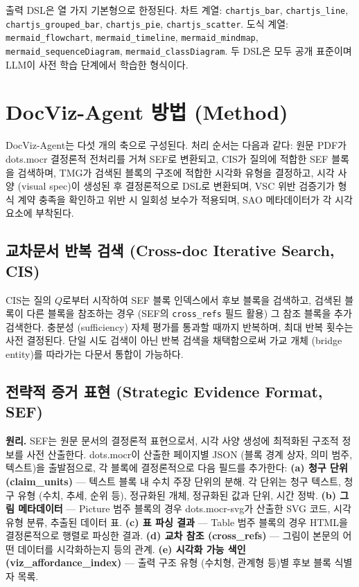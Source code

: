 \documentclass[11pt]{article}
\begin{document}
출력 DSL은 열 가지 기본형으로 한정된다. 차트 계열: \texttt{chartjs\_bar}, \texttt{chartjs\_line}, \texttt{chartjs\_grouped\_bar}, \texttt{chartjs\_pie}, \texttt{chartjs\_scatter}. 도식 계열: \texttt{mermaid\_flowchart}, \texttt{mermaid\_timeline}, \texttt{mermaid\_mindmap}, \texttt{mermaid\_sequenceDiagram}, \texttt{mermaid\_classDiagram}. 두 DSL은 모두 공개 표준이며 LLM이 사전 학습 단계에서 학습한 형식이다.

\section{DocViz-Agent 방법 (Method)}

DocViz-Agent는 다섯 개의 축으로 구성된다. 처리 순서는 다음과 같다: 원문 PDF가 dots.mocr 결정론적 전처리를 거쳐 SEF로 변환되고, CIS가 질의에 적합한 SEF 블록을 검색하며, TMG가 검색된 블록의 구조에 적합한 시각화 유형을 결정하고, 시각 사양 (visual spec)이 생성된 후 결정론적으로 DSL로 변환되며, VSC 위반 검증기가 형식 계약 충족을 확인하고 위반 시 일회성 보수가 적용되며, SAO 메타데이터가 각 시각 요소에 부착된다.

\subsection{교차문서 반복 검색 (Cross-doc Iterative Search, CIS)}

CIS는 질의 $Q$로부터 시작하여 SEF 블록 인덱스에서 후보 블록을 검색하고, 검색된 블록이 다른 블록을 참조하는 경우 (SEF의 \texttt{cross\_refs} 필드 활용) 그 참조 블록을 추가 검색한다. 충분성 (sufficiency) 자체 평가를 통과할 때까지 반복하며, 최대 반복 횟수는 사전 결정된다. 단일 시도 검색이 아닌 반복 검색을 채택함으로써 가교 개체 (bridge entity)를 따라가는 다문서 통합이 가능하다.

\subsection{전략적 증거 표현 (Strategic Evidence Format, SEF)}
\label{sec:sef}

\textbf{원리.} SEF는 원문 문서의 결정론적 표현으로서, 시각 사양 생성에 최적화된 구조적 정보를 사전 산출한다. dots.mocr이 산출한 페이지별 JSON (블록 경계 상자, 의미 범주, 텍스트)을 출발점으로, 각 블록에 결정론적으로 다음 필드를 추가한다: \textbf{(a) 청구 단위 (claim\_units)} — 텍스트 블록 내 수치 주장 단위의 분해. 각 단위는 청구 텍스트, 청구 유형 (수치, 추세, 순위 등), 정규화된 개체, 정규화된 값과 단위, 시간 정박. \textbf{(b) 그림 메타데이터} — Picture 범주 블록의 경우 dots.mocr-svg가 산출한 SVG 코드, 시각 유형 분류, 추출된 데이터 표. \textbf{(c) 표 파싱 결과} — Table 범주 블록의 경우 HTML을 결정론적으로 행렬로 파싱한 결과. \textbf{(d) 교차 참조 (cross\_refs)} — 그림이 본문의 어떤 데이터를 시각화하는지 등의 관계. \textbf{(e) 시각화 가능 색인 (viz\_affordance\_index)} — 출력 구조 유형 (수치형, 관계형 등)별 후보 블록 식별자 목록.
\end{document}
